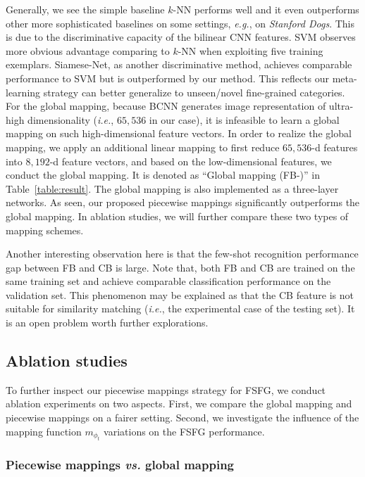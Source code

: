 \documentclass[10pt,twocolumn,letterpaper]{article}
\begin{document}
Generally, we see the simple baseline $k$-NN performs well and it even outperforms other more sophisticated baselines on some settings, \emph{e.g.}, on \emph{Stanford Dogs}. This is due to the discriminative capacity of the bilinear CNN features. SVM observes more obvious advantage comparing to $k$-NN when exploiting five training exemplars. Siamese-Net, as another discriminative method, achieves comparable performance to SVM but is outperformed by our method. This reflects our meta-learning strategy can better generalize to unseen/novel fine-grained categories. For the global mapping, because BCNN generates image representation of ultra-high dimensionality (\emph{i.e.}, $65,536$ in our case), it is infeasible to learn a global mapping on such high-dimensional feature vectors. In order to realize the global mapping, we apply an additional linear mapping to first reduce $65,536$-d features into $8,192$-d feature vectors, and based on the low-dimensional features, we conduct the global mapping. It is denoted as ``Global mapping (FB-)'' in Table~\ref{table:result}. The global mapping is also implemented as a three-layer networks. As seen, our proposed piecewise mappings significantly outperforms the global mapping. In ablation studies, we will further compare these two types of mapping schemes. 

Another interesting observation here is that the few-shot recognition performance gap between FB and CB is large. Note that, both FB and CB are trained on the same training set and achieve comparable classification performance on the validation set. This phenomenon may be explained as that the CB feature is not suitable for similarity matching (\emph{i.e.}, the experimental case of the testing set). It is an open problem worth further explorations.


\subsection{Ablation studies}

To further inspect our piecewise mappings strategy for FSFG, we conduct ablation experiments on two aspects. First, we compare the global mapping and piecewise mappings on a fairer setting. Second, we investigate the influence of the mapping function $m_{\phi_{t}}$ variations on the FSFG performance.

\subsubsection{Piecewise mappings \emph{vs.} global mapping}\label{sec:PMvsGM}
\end{document}
